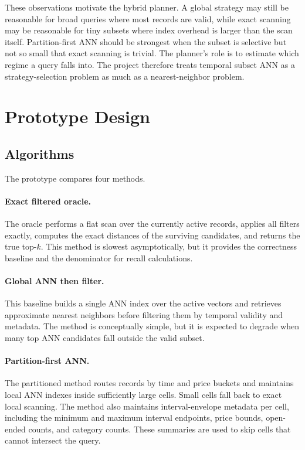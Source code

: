 \documentclass[sigconf,nonacm]{acmart}
\begin{document}
These observations motivate the hybrid planner. A global strategy may still be reasonable for broad queries where most records are valid, while exact scanning may be reasonable for tiny subsets where index overhead is larger than the scan itself. Partition-first ANN should be strongest when the subset is selective but not so small that exact scanning is trivial. The planner's role is to estimate which regime a query falls into. The project therefore treats temporal subset ANN as a strategy-selection problem as much as a nearest-neighbor problem.

\section{Prototype Design}

\subsection{Algorithms}

The prototype compares four methods.

\paragraph{Exact filtered oracle.}
The oracle performs a flat scan over the currently active records, applies all filters exactly, computes the exact distances of the surviving candidates, and returns the true top-$k$. This method is slowest asymptotically, but it provides the correctness baseline and the denominator for recall calculations.

\paragraph{Global ANN then filter.}
This baseline builds a single ANN index over the active vectors and retrieves approximate nearest neighbors before filtering them by temporal validity and metadata. The method is conceptually simple, but it is expected to degrade when many top ANN candidates fall outside the valid subset.

\paragraph{Partition-first ANN.}
The partitioned method routes records by time and price buckets and maintains local ANN indexes inside sufficiently large cells. Small cells fall back to exact local scanning. The method also maintains interval-envelope metadata per cell, including the minimum and maximum interval endpoints, price bounds, open-ended counts, and category counts. These summaries are used to skip cells that cannot intersect the query.
\end{document}

